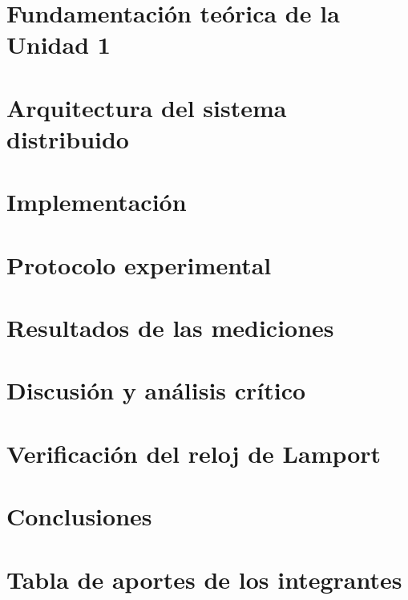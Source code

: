 \documentclass[11pt,a4paper,oneside]{article}
\begin{document}
\section{Fundamentación teórica de la Unidad 1}





\section{Arquitectura del sistema distribuido}


\section{Implementación}




\section{Protocolo experimental}


\section{Resultados de las mediciones}


\section{Discusión y análisis crítico}


\section{Verificación del reloj de Lamport}


\section{Conclusiones}


\section{Tabla de aportes de los integrantes}

\end{document}
